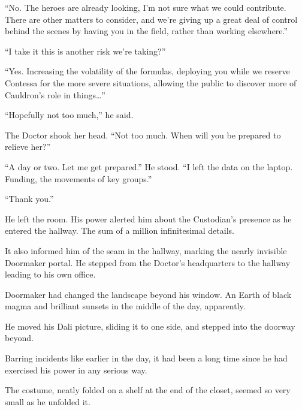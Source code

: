 ``No.  The heroes are already looking, I'm not sure what we could contribute.  There are other matters to consider, and we're giving up a great deal of control behind the scenes by having you in the field, rather than working elsewhere.''



``I take it this is another risk we're taking?''



``Yes.  Increasing the volatility of the formulas, deploying you while we reserve Contessa for the more severe situations, allowing the public to discover more of Cauldron's role in things\ldots''



``Hopefully not too much,'' he said.



The Doctor shook her head.  ``Not too much.  When will you be prepared to relieve her?''



``A day or two.  Let me get prepared.''  He stood.  ``I left the data on the laptop.  Funding, the movements of key groups.''



``Thank you.''



He left the room.  His power alerted him about the Custodian's presence as he entered the hallway.  The sum of a million infinitesimal details.



It also informed him of the seam in the hallway, marking the nearly invisible Doormaker portal.  He stepped from the Doctor's headquarters to the hallway leading to his own office.



Doormaker had changed the landscape beyond his window.  An Earth of black magma and brilliant sunsets in the middle of the day, apparently.



He moved his Dali picture, sliding it to one side, and stepped into the doorway beyond.



Barring incidents like earlier in the day, it had been a long time since he had exercised his power in any serious way.



The costume, neatly folded on a shelf at the end of the closet, seemed so very small as he unfolded it.



